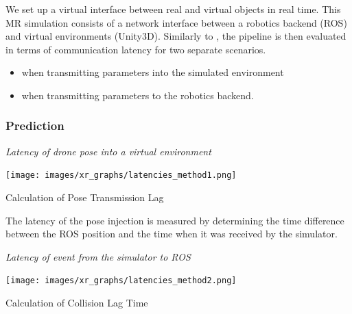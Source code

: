 We set up a virtual interface between real and virtual objects in real time. This MR simulation consists of a network interface between a robotics backend (ROS) and virtual environments (Unity3D). Similarly to \cite{mr_planetary}, the pipeline is then evaluated in terms of communication latency for two separate scenarios.
\begin{itemize}
    \item when transmitting parameters into the simulated environment
    \item when transmitting parameters to the robotics backend.
\end{itemize}





\subsubsection{Prediction}

\textit{Latency of drone pose into a virtual environment}

\begin{marginfigure}%
    \raggedright
    \vspace{-1cm}
    \hspace{0.2cm}\texttt{[image: images/xr\_graphs/latencies\_method1.png]}
    \caption{Calculation of Pose Transmission Lag}
    \label{collision_lag_time}
\end{marginfigure}

The latency of the pose injection is measured by determining the time difference between the ROS position and the time when it was received by the simulator. 

\textit{Latency of event from the simulator to ROS}

\begin{marginfigure}%
    \raggedright
    \hspace{0.2cm}\texttt{[image: images/xr\_graphs/latencies\_method2.png]}
    \caption{Calculation of Collision Lag Time}
    \label{collision_lag_time}
\end{marginfigure}

